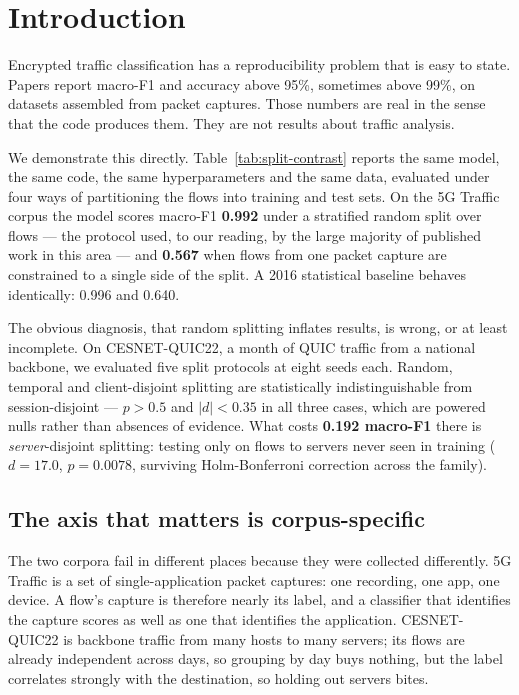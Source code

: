 \section{Introduction}
\label{sec:introduction}

Encrypted traffic classification has a reproducibility problem that is easy to
state. Papers report macro-F1 and accuracy above 95\%, sometimes above 99\%,
on datasets assembled from packet captures. Those numbers are real in the sense
that the code produces them. They are not results about traffic analysis.

We demonstrate this directly. Table~\ref{tab:split-contrast} reports the same
model, the same code, the same hyperparameters and the same data, evaluated
under four ways of partitioning the flows into training and test sets. On the
5G Traffic corpus the model scores macro-F1 \textbf{0.992} under a stratified
random split over flows --- the protocol used, to our reading, by the large
majority of published work in this area --- and \textbf{0.567} when flows from
one packet capture are constrained to a single side of the split. A 2016
statistical baseline behaves identically: 0.996 and 0.640.

The obvious diagnosis, that random splitting inflates results, is wrong, or at
least incomplete. On CESNET-QUIC22, a month of QUIC traffic from a national
backbone, we evaluated five split protocols at eight seeds each. Random,
temporal and client-disjoint splitting are statistically indistinguishable from
session-disjoint --- $p > 0.5$ and $|d| < 0.35$ in all three cases, which are
powered nulls rather than absences of evidence. What costs
\textbf{0.192 macro-F1} there is \emph{server}-disjoint splitting: testing only
on flows to servers never seen in training ($d = 17.0$, $p = 0.0078$, surviving
Holm-Bonferroni correction across the family).

\subsection*{The axis that matters is corpus-specific}

The two corpora fail in different places because they were collected
differently. 5G Traffic is a set of single-application packet captures: one
recording, one app, one device. A flow's capture is therefore nearly its label,
and a classifier that identifies the capture scores as well as one that
identifies the application. CESNET-QUIC22 is backbone traffic from many hosts
to many servers; its flows are already independent across days, so grouping by
day buys nothing, but the label correlates strongly with the destination, so
holding out servers bites.

